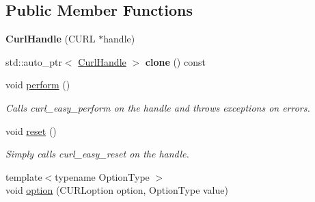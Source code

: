 \subsection*{Public Member Functions}
\begin{DoxyCompactItemize}
\item 
\hypertarget{classcurlpp_1_1internal_1_1CurlHandle_adb6fcf013135805a31c3dc065d0e61e7}{{\bfseries Curl\-Handle} (C\-U\-R\-L $\ast$handle)}\label{classcurlpp_1_1internal_1_1CurlHandle_adb6fcf013135805a31c3dc065d0e61e7}

\item 
\hypertarget{classcurlpp_1_1internal_1_1CurlHandle_a580b97234e3973eaa783272c2e12cded}{std\-::auto\-\_\-ptr$<$ \hyperlink{classcurlpp_1_1internal_1_1CurlHandle}{Curl\-Handle} $>$ {\bfseries clone} () const }\label{classcurlpp_1_1internal_1_1CurlHandle_a580b97234e3973eaa783272c2e12cded}

\item 
\hypertarget{classcurlpp_1_1internal_1_1CurlHandle_a9b2fa00ec86b7c6ea86068eed1ae4b71}{void \hyperlink{classcurlpp_1_1internal_1_1CurlHandle_a9b2fa00ec86b7c6ea86068eed1ae4b71}{perform} ()}\label{classcurlpp_1_1internal_1_1CurlHandle_a9b2fa00ec86b7c6ea86068eed1ae4b71}

\begin{DoxyCompactList}\small\item\em Calls curl\-\_\-easy\-\_\-perform on the handle and throws exceptions on errors. \end{DoxyCompactList}\item 
\hypertarget{classcurlpp_1_1internal_1_1CurlHandle_ac884758256b2735eb2ab1f037c38ce9f}{void \hyperlink{classcurlpp_1_1internal_1_1CurlHandle_ac884758256b2735eb2ab1f037c38ce9f}{reset} ()}\label{classcurlpp_1_1internal_1_1CurlHandle_ac884758256b2735eb2ab1f037c38ce9f}

\begin{DoxyCompactList}\small\item\em Simply calls curl\-\_\-easy\-\_\-reset on the handle. \end{DoxyCompactList}\item 
\hypertarget{classcurlpp_1_1internal_1_1CurlHandle_a715e437b50f34871318e8256d7c78765}{{\footnotesize template$<$typename Option\-Type $>$ }\\void \hyperlink{classcurlpp_1_1internal_1_1CurlHandle_a715e437b50f34871318e8256d7c78765}{option} (C\-U\-R\-Loption option, Option\-Type value)}\label{classcurlpp_1_1internal_1_1CurlHandle_a715e437b50f34871318e8256d7c78765}


\end{DoxyCompactItemize}
